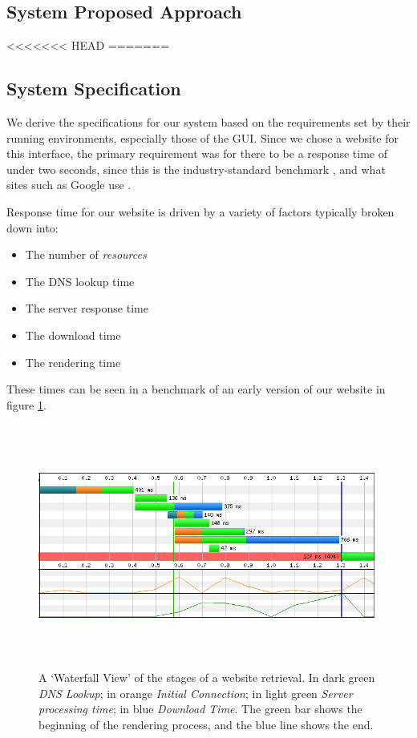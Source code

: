 

\subsection{System Proposed Approach}

<<<<<<< HEAD
=======
\subsection{System Specification}

We derive the specifications for our system based on the requirements
set by their running environments, especially those of the GUI. Since
we chose a website for this interface, the primary requirement was for
there to be a response time of under two seconds, since this is the
industry-standard benchmark \cite{akamai}, and what sites such as
Google use \cite{two-seconds}.

Response time for our website is driven by a variety of factors
typically broken down into:

\begin{itemize}
  \item The number of \emph{resources}
  \item The DNS lookup time
  \item The server response time
  \item The download time
  \item The rendering time
\end{itemize}

These times can be seen in a benchmark of an early version of our
website in figure \ref{fig-website-benchmark}.

\begin{figure}[htp]
  \centering
  \includegraphics[height=8cm]{graphics/performance.png}
  \caption{A `Waterfall View' of the stages of a website retrieval. In
  dark green \emph{DNS Lookup}; in orange \emph{Initial Connection};
  in light green \emph{Server processing time}; in blue \emph{Download
  Time}. The green bar shows the beginning of the rendering process,
and the blue line shows the end.}
  \label{fig-website-benchmark}
\end{figure}

